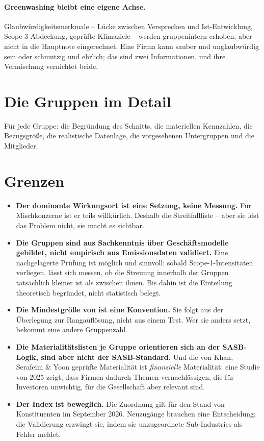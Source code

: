 \documentclass[11pt,a4paper]{article}
\begin{document}
\paragraph{Greenwashing bleibt eine eigene Achse.} Glaubwürdigkeitsmerkmale -- Lücke zwischen Versprechen und Ist-Entwicklung, Scope-3-Abdeckung, geprüfte Klimaziele -- werden gruppenintern erhoben, aber nicht in die Hauptnote eingerechnet. Eine Firma kann sauber und unglaubwürdig sein oder schmutzig und ehrlich; das sind zwei Informationen, und ihre Vermischung vernichtet beide.

\section{Die Gruppen im Detail}
\label{sec:details}

Für jede Gruppe: die Begründung des Schnitts, die materiellen Kennzahlen, die Bezugsgröße, die realistische Datenlage, die vorgesehenen Untergruppen und die Mitglieder.



\section{Grenzen}

\begin{itemize}
\item \textbf{Der dominante Wirkungsort ist eine Setzung, keine Messung.} Für Mischkonzerne ist er teils willkürlich. Deshalb die Streitfallliste -- aber sie löst das Problem nicht, sie macht es sichtbar.
\item \textbf{Die Gruppen sind aus Sachkenntnis über Geschäftsmodelle gebildet, nicht empirisch aus Emissionsdaten validiert.} Eine nachgelagerte Prüfung ist möglich und sinnvoll: sobald Scope-1-Intensitäten vorliegen, lässt sich messen, ob die Streuung innerhalb der Gruppen tatsächlich kleiner ist als zwischen ihnen. Bis dahin ist die Einteilung theoretisch begründet, nicht statistisch belegt.
\item \textbf{Die Mindestgröße von \MinSize{} ist eine Konvention.} Sie folgt aus der Überlegung zur Rangauflösung, nicht aus einem Test. Wer sie anders setzt, bekommt eine andere Gruppenzahl.
\item \textbf{Die Materialitätslisten je Gruppe orientieren sich an der SASB-Logik, sind aber nicht der SASB-Standard.} Und die von Khan, Serafeim \& Yoon geprüfte Materialität ist \emph{finanzielle} Materialität: eine Studie von 2025 zeigt, dass Firmen dadurch Themen vernachlässigen, die für Investoren unwichtig, für die Gesellschaft aber relevant sind.
\item \textbf{Der Index ist beweglich.} Die Zuordnung gilt für den Stand von \NFirms{} Konstituenten im September 2026. Neuzugänge brauchen eine Entscheidung; die Validierung erzwingt sie, indem sie unzugeordnete Sub-Industries als Fehler meldet.
\end{itemize}
\end{document}
